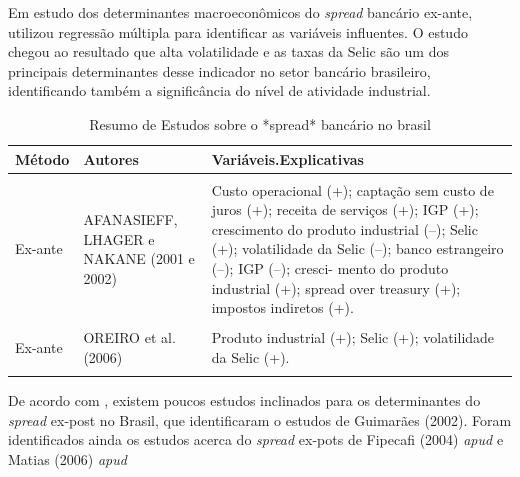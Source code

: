 \documentclass[12pt,openright,oneside,a4paper,chapter=TITLE,section=TITLE,subsection=Title,english,french,spanish,portugues,sumario=tradicional]{04-class-files/abntex2}
\begin{document}
Em estudo dos determinantes macroeconômicos do \emph{spread} bancário ex-ante, \textcite{oreiro-2006} utilizou regressão múltipla para identificar as variáveis influentes. O estudo chegou ao resultado que alta volatilidade e as taxas da Selic são um dos principais determinantes desse indicador no setor bancário brasileiro, identificando também a significância do nível de atividade industrial.

\begin{table}
\caption{Resumo de Estudos sobre o *spread* bancário no brasil}
\begingroup\fontsize{10}{12}\selectfont

\begin{tabu} to 
\toprule
Método & Autores & Variáveis.Explicativas\\
\midrule
{} &  & \\
Ex-ante & AFANASIEFF, LHAGER e NAKANE (2001 e 2002) & Custo operacional (+); captação sem custo de juros (+); receita de serviços (+); IGP (+); crescimento do produto industrial (–); Selic (+); volatilidade da Selic (–); banco estrangeiro (–); IGP (–); cresci- mento do produto industrial (+); spread over treasury (+); impostos indiretos (+).\\
 &  & \\
Ex-ante & OREIRO et al. (2006) & Produto industrial (+); Selic (+); volatilidade da Selic (+).\\
 &  & \\
\bottomrule
\end{tabu}
\endgroup{}
\label{tab:estudos}
\end{table}

De acordo com \textcite{durigan:2018, dantas:2012}, existem poucos estudos inclinados para os determinantes do \emph{spread} ex-post no Brasil, que identificaram o estudos de Guimarães (2002). Foram identificados ainda os estudos acerca do \emph{spread} ex-pots de Fipecafi (2004) \emph{apud} \textcite{dantas:2012} e Matias (2006) \emph{apud} \textcite{leal:2006}
\end{document}
